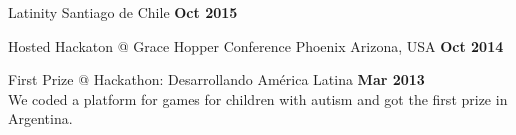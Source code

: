 \documentclass[margin,line]{resume}
\begin{document}
\begin{resume}
\begin{list2}
\item  Latinity Santiago de Chile \textbf{Oct 2015}

\item Hosted Hackaton @ Grace Hopper Conference Phoenix Arizona, USA \hfill \textbf{Oct 2014} 

\item First Prize @ Hackathon: Desarrollando Am\'erica Latina \hfill \textbf{Mar 2013} \\
We coded a platform for games for children with autism and got the first prize in Argentina.
\end{list2}



    

\end{resume}
\end{document}
